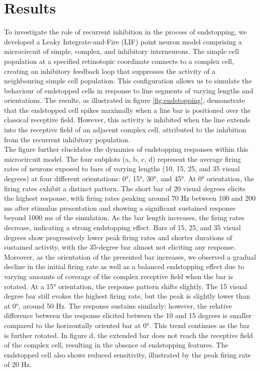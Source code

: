 \documentclass[12pt]{article}
\begin{document}
\section*{Results}
To investigate the role of recurrent inhibition in the process of endstopping, we developed a Leaky Integrate-and-Fire (LIF) point neuron model comprising a microcircuit of simple, complex, and inhibitory interneurons. The simple cell population at a specified retinotopic coordinate connects to a complex cell, creating an inhibitory feedback loop that suppresses the activity of a neighbouring simple cell population. This configuration allows us to simulate the behaviour of endstopped cells in response to line segments of varying lengths and orientations. The results, as illustrated in figure \ref{fig:endstopping}, demonstrate that the endstopped cell spikes maximally when a line bar is positioned over the classical receptive field. However, this activity is inhibited when the line extends into the receptive field of an adjacent complex cell, attributed to the inhibition from the recurrent inhibitory population.
\\
The figure further elucidates the dynamics of endstopping responses within this microcircuit model. The four subplots (a, b, c, d) represent the average firing rates of neurons exposed to bars of varying lengths (10, 15, 25, and 35 visual degrees) at four different orientations: 0°, 15°, 30°, and 45°. At 0° orientation, the firing rates exhibit a distinct pattern. The short bar of 20 visual degrees elicits the highest response, with firing rates peaking around 70 Hz between 100 and 200 ms after stimulus presentation and showing a significant sustained response beyond 1000 ms of the simulation. As the bar length increases, the firing rates decrease, indicating a strong endstopping effect. Bars of 15, 25, and 35 visual degrees show progressively lower peak firing rates and shorter durations of sustained activity, with the 35-degree bar almost not eliciting any response. Moreover, as the orientation of the presented bar increases, we observed a gradual decline in the initial firing rate as well as a balanced endstopping effect due to varying amounts of coverage of the complex receptive field when the bar is rotated. At a 15° orientation, the response pattern shifts slightly. The 15 visual degree bar still evokes the highest firing rate, but the peak is slightly lower than at 0°, around 50 Hz. The response sustains similarly; however, the relative difference between the response elicited between the 10 and 15 degrees is smaller compared to the horizontally oriented bar at 0°. This trend continues as the bar is further rotated. In figure d, the extended bar does not reach the receptive field of the complex cell, resulting in the absence of endstopping features. The endstopped cell also shows reduced sensitivity, illustrated by the peak firing rate of 20 Hz.
\end{document}
